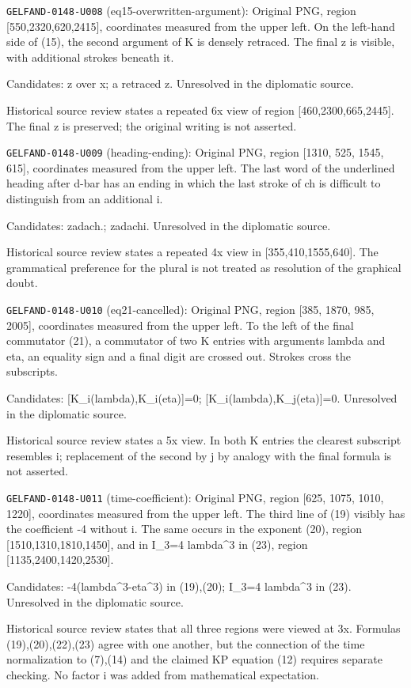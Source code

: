 \noindent\texttt{GELFAND-0148-U008} (eq15-overwritten-argument): Original PNG, region [550,2320,620,2415], coordinates measured from the upper left. On the left-hand side of (15), the second argument of K is densely retraced. The final z is visible, with additional strokes beneath it.\par
Candidates: z over x; a retraced z. Unresolved in the diplomatic source.\par
Historical source review states a repeated 6x view of region [460,2300,665,2445]. The final z is preserved; the original writing is not asserted.\par

\noindent\texttt{GELFAND-0148-U009} (heading-ending): Original PNG, region [1310, 525, 1545, 615], coordinates measured from the upper left. The last word of the underlined heading after d-bar has an ending in which the last stroke of ch is difficult to distinguish from an additional i.\par
Candidates: zadach.; zadachi. Unresolved in the diplomatic source.\par
Historical source review states a repeated 4x view in [355,410,1555,640]. The grammatical preference for the plural is not treated as resolution of the graphical doubt.\par

\noindent\texttt{GELFAND-0148-U010} (eq21-cancelled): Original PNG, region [385, 1870, 985, 2005], coordinates measured from the upper left. To the left of the final commutator (21), a commutator of two K entries with arguments lambda and eta, an equality sign and a final digit are crossed out. Strokes cross the subscripts.\par
Candidates: [K\_i(lambda),K\_i(eta)]=0; [K\_i(lambda),K\_j(eta)]=0. Unresolved in the diplomatic source.\par
Historical source review states a 5x view. In both K entries the clearest subscript resembles i; replacement of the second by j by analogy with the final formula is not asserted.\par

\noindent\texttt{GELFAND-0148-U011} (time-coefficient): Original PNG, region [625, 1075, 1010, 1220], coordinates measured from the upper left. The third line of (19) visibly has the coefficient -4 without i. The same occurs in the exponent (20), region [1510,1310,1810,1450], and in I\_3=4 lambda\textasciicircum{}3 in (23), region [1135,2400,1420,2530].\par
Candidates: -4(lambda\textasciicircum{}3-eta\textasciicircum{}3) in (19),(20); I\_3=4 lambda\textasciicircum{}3 in (23). Unresolved in the diplomatic source.\par
Historical source review states that all three regions were viewed at 3x. Formulas (19),(20),(22),(23) agree with one another, but the connection of the time normalization to (7),(14) and the claimed KP equation (12) requires separate checking. No factor i was added from mathematical expectation.\par

